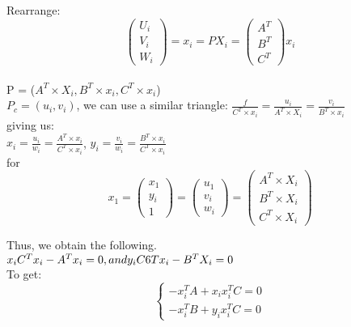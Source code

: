\documentclass[12pt]{article}
\begin{document}
\noindent Rearrange:
\[
\begin{pmatrix}
U_{i} \\ V_{i} \\ W_{i}
\end{pmatrix} = x_{i}=PX_{i} = 
\begin{pmatrix}
A^{T} \\ B^{T} \\ C^{T}
\end{pmatrix} x_{i}
\]\\

\noindent 
P = ($A^{T} \times X_{i}, B^{T} \times x_{i}, C^{T} \times x_{i}$) \\

\noindent
$P_{c} = (u_{i}, v_{i})$, we can use a similar triangle:
$\frac{f}{C^{T} \times x_{i}} = \frac{u_{i}}{A^{T} \times X_{i}} = \frac{v_{i}}{B^{T} \times x_{i}}$ \\

\noindent giving us: \\
$x_{i} = \frac{u_{i}}{w_{i}} = \frac{A^{T} \times x_{i}}{C^{T} \times x_{i}}$,
$y_{i} = \frac{v_{i}}{w_{i}} = \frac{B^{T} \times x_{i}}{C^{T} \times x_{i}}$\\

\noindent for\\
\[x_{1} = 
\begin{pmatrix}
x_{1}\\
y_{i}\\
1
\end{pmatrix} = 
\begin{pmatrix}
u_{1}\\
v_{i}\\
w_{i}
\end{pmatrix} = 
\begin{pmatrix}
A^{T} \times X_{i}\\
B^{T} \times X_{i}\\
C^{T} \times X_{i}
\end{pmatrix}
\]

\noindent Thus, we obtain the following.\\
$x_{i}C^{T}x_{i}-A^{T}x_{i} = 0, \\
and \\
y_{i}C6{T}x_{i} - B^{T}X_{i} = 0$\\

\noindent To get:
\[
\left\{
    \begin{array}{l}
        -x_{i}^{T}A + x_{i}x_{i}^{T}C = 0 \\
        -x_{i}^{T}B + y_{i}x_{i}^{T}C = 0
    \end{array}
\right.
\]
\end{document}
